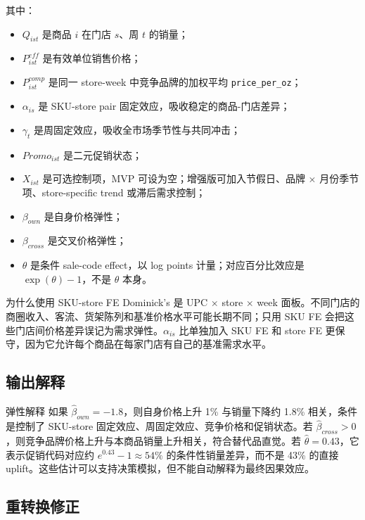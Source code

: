 \documentclass[UTF8,11pt,a4paper,fontset=none]{ctexart}
\begin{document}
其中：
\begin{itemize}
  \item $Q_{ist}$ 是商品 $i$ 在门店 $s$、周 $t$ 的销量；
  \item $P^{eff}_{ist}$ 是有效单位销售价格；
  \item $P^{comp}_{ist}$ 是同一 store-week 中竞争品牌的加权平均 \texttt{price\_per\_oz}；
  \item $\alpha_{is}$ 是 SKU-store pair 固定效应，吸收稳定的商品-门店差异；
  \item $\gamma_t$ 是周固定效应，吸收全市场季节性与共同冲击；
  \item $Promo_{ist}$ 是二元促销状态；
  \item $X_{ist}$ 是可选控制项，MVP 可设为空；增强版可加入节假日、品牌 $\times$ 月份季节项、store-specific trend 或滞后需求控制；
  \item $\beta_{own}$ 是自身价格弹性；
  \item $\beta_{cross}$ 是交叉价格弹性；
  \item $\theta$ 是条件 sale-code effect，以 log points 计量；对应百分比效应是 $\exp(\theta)-1$，不是 $\theta$ 本身。
\end{itemize}

\begin{decisionbox}{为什么使用 SKU-store FE}
Dominick's 是 UPC $\times$ store $\times$ week 面板。不同门店的商圈收入、客流、货架陈列和基准价格水平可能长期不同；只用 SKU FE 会把这些门店间价格差异误记为需求弹性。$\alpha_{is}$ 比单独加入 SKU FE 和 store FE 更保守，因为它允许每个商品在每家门店有自己的基准需求水平。
\end{decisionbox}

\subsection{输出解释}

\begin{decisionbox}{弹性解释}
如果 $\widehat{\beta}_{own}=-1.8$，则自身价格上升 1\% 与销量下降约 1.8\% 相关，条件是控制了 SKU-store 固定效应、周固定效应、竞争价格和促销状态。若 $\widehat{\beta}_{cross}>0$，则竞争品牌价格上升与本商品销量上升相关，符合替代品直觉。若 $\widehat{\theta}=0.43$，它表示促销代码对应约 $e^{0.43}-1\approx54\%$ 的条件性销量差异，而不是 43\% 的直接 uplift。这些估计可以支持决策模拟，但不能自动解释为最终因果效应。
\end{decisionbox}

\subsection{重转换修正}
\end{document}
